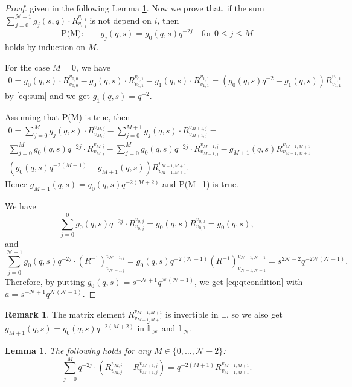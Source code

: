 \documentclass[reqno,a4paper,11pt]{amsart}
\numberwithin{equation}{section}
\numberwithin{figure}{section}
\theoremstyle{definition}
\newtheorem{rmk}[defn]{Remark}
\theoremstyle{plain}
\newtheorem{lem}[defn]{Lemma}
\newcommand{\Li}{{\mathbb L}}
\newcommand{\cN}{\mathcal{N}}
\renewcommand{\leq}{\leqslant}
\begin{document}
\begin{proof}
given in the following Lemma \ref{lem:qptr}.  
%
Now we prove that, if the sum  $\sum_{j=0}^{\cN-1}g_j(s,q) \cdot 
R_{v_{i,j}}^{v_{i,j}}$ is not depend on $i$, then
\[
\text{P(M):} \qquad g_j(q, s) = g_0(q, s) q^{-2j}\quad 
\text{for $0 \leq j \leq M$}
\]
holds by induction on $M$.  
 \par
For the case $M=0$, we have 
\begin{multline*}
0 = g_0(q,s) \cdot 
R_{v_{0,0}}^{v_{0,0}} - g_0(q,s) \cdot 
R_{v_{0,1}}^{v_{0,1}}- g_1(q,s) \cdot 
R_{v_{1,1}}^{v_{1,1}}
=
(g_0(q,s) q^{-2} - g_1(q, s)) R_{v_{1,1}}^{v_{1,1}}
\end{multline*}
by \eqref{eq:sum} and we get $g_1(q,s) = q^{-2}$.  
\par
Assuming that P(M) is true, then 
  \begin{multline*}
0 = \sum_{j=0}^{M}g_j(q, s) \cdot 
R_{v_{M,j}}^{v_{M,j}}
-
\sum_{j=0}^{M+1}g_j(q, s) \cdot 
R_{v_{M+1,j}}^{v_{M+1,j}}
=
\\
\sum_{j=0}^{M}g_0(q, s)q^{-2j} \cdot 
R_{v_{M,j}}^{v_{M,j}}
-
\sum_{j=0}^{M}g_0(q, s)q^{-2j} \cdot 
R_{v_{M+1,j}}^{v_{M+1,j}}
- g_{M+1}(q, s) R_{v_{M+1,M+1}}^{v_{M+1,M+1}}
=
\\
(g_0(q,s)q^{-2(M+1)} 
- g_{M+1}(q, s) ) R_{v_{M+1,M+1}}^{v_{M+1,M+1}}.
\end{multline*}
Hence $g_{M+1}(q, s) = q_0(q, s) q^{-2(M+2)}$ and P(M+1) is true.  
\par
We have
\[\sum_{j=0}^{0}g_0(q, s)q^{-2j} \cdot 
R_{v_{0,j}}^{v_{0,j}}=
g_0(q,s)R_{v_{0,0}}^{v_{0,0}}
= g_0(q,s),
\]
and
\[
\sum_{j=0}^{\cN-1}g_0(q, s)q^{-2j} \cdot 
(R^{-1})_{v_{\cN-1,j}}^{v_{\cN-1,j}}
=
g_0(q, s){q^{-2(\cN-1)}}(R^{-1})_{v_{\cN-1,\cN-1}}^{v_{\cN-1,\cN-1}}
=
s^{2\cN-2}q^{{-2\cN(\cN-1)}}. 
\]
Therefore, by putting $g_{0}(q, s) = s^{-\cN+1}q^{{\cN(\cN-1)}}$,
we get \eqref{eq:qtcondition} with $a = s^{-\cN+1}q^{{\cN(\cN-1)}}$.  
\end{proof}
%
\begin{rmk}
The matrix element $R_{v_{M+1,M+1}}^{v_{M+1,M+1}}$ is  invertible  in $\Li$, so we also get $g_{M+1}(q, s) = q_0(q, s) q^{-2(M+2)}$ in $\widetilde \Li_\cN$ and $\Li_\cN$.
\end{rmk}
%
%
\begin{lem}\label{lem:qptr}
The following holds for any $M \in \{0,\dots,\cN-2\}$:
\begin{equation}
\sum_{j=0}^{M}q^{-2j} \cdot 
\left(R_{v_{M,j}}^{v_{M,j}}
-
R_{v_{M+1,j}}^{v_{M+1,j}}\right)
=
q^{-2(M+1)}R_{v_{M+1,M+1}}^{v_{M+1,M+1}}.
\label{eq:sum1}
\end{equation}
\end{lem}
\end{document}

